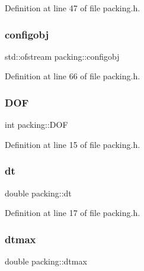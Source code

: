 Definition at line 47 of file packing.\+h.

\mbox{\label{classpacking_af156dc6a748d6330d8d058d7b623f33e}} 
\subsubsection{\texorpdfstring{configobj}{configobj}}
{\footnotesize\ttfamily std\+::ofstream packing\+::configobj\hspace{0.3cm}{\ttfamily [protected]}}



Definition at line 66 of file packing.\+h.

\mbox{\label{classpacking_a154fee4288694b65d28f5d904b1784b6}} 
\subsubsection{\texorpdfstring{D\+OF}{DOF}}
{\footnotesize\ttfamily int packing\+::\+D\+OF\hspace{0.3cm}{\ttfamily [protected]}}



Definition at line 15 of file packing.\+h.

\mbox{\label{classpacking_a61dd57ff727cdffa0573189b14a372d3}} 
\subsubsection{\texorpdfstring{dt}{dt}}
{\footnotesize\ttfamily double packing\+::dt\hspace{0.3cm}{\ttfamily [protected]}}



Definition at line 17 of file packing.\+h.

\mbox{\label{classpacking_ae4a4b73d1937c50d564cd71886d17fab}} 
\subsubsection{\texorpdfstring{dtmax}{dtmax}}
{\footnotesize\ttfamily double packing\+::dtmax\hspace{0.3cm}{\ttfamily [protected]}}



